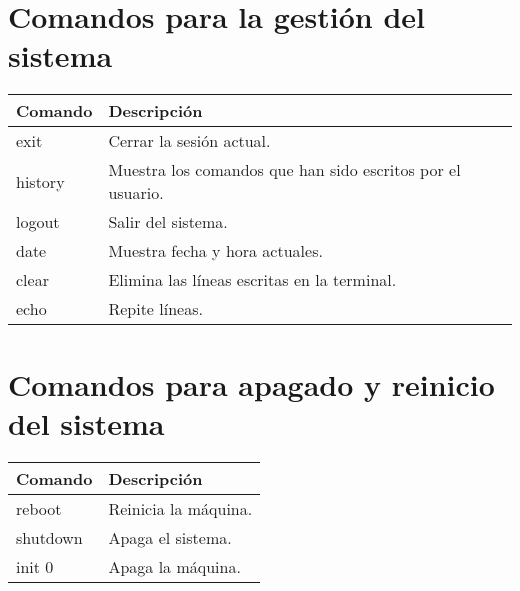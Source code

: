 \documentclass[10pt]{article}
\begin{document}
\section{Comandos para la gestión del sistema}
\begin {tabular}{||l|l||}
\hline \hline
Comando & Descripción  \\ \hline
exit & Cerrar la sesión actual.  \\ \hline
history & Muestra los comandos que han sido escritos por el usuario.  \\ \hline
logout & Salir del sistema.  \\ \hline
date & Muestra fecha y hora actuales. \\ \hline
clear & Elimina las líneas escritas en la terminal.\\ \hline 
echo & Repite líneas. \\ \hline \hline
\end{tabular}
\section{Comandos para apagado y reinicio del sistema}
\begin{tabular}{||l|l||} \hline \hline
Comando & Descripción \\ \hline
reboot & Reinicia la máquina. \\ \hline
shutdown & Apaga el sistema. \\ \hline 
init 0 & Apaga la máquina. \\ \hline \hline
\end{tabular}


\end{document}
